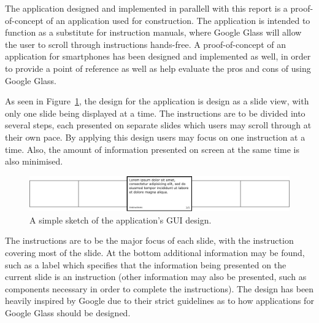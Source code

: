 The application designed and implemented in parallell with this report is a proof-of-concept of an application used for construction. The application is intended to function as a substitute for instruction manuals, where Google Glass will allow the user to scroll through instructions hands-free. A proof-of-concept of an application for smartphones has been designed and implemented as well, in order to provide a point of reference as well as help evaluate the pros and cons of using Google Glass.

As seen in Figure~\ref{cardDesign}, the design for the application is design as a slide view, with only one slide being displayed at a time. The instructions are to be divided into several steps, each presented on separate slides which users may scroll through at their own pace. By applying this design users may focus on one instruction at a time. Also, the amount of information presented on screen at the same time is also minimised. 

	\begin{figure}[ht!]
		\centering
		\includegraphics[width=150mm]{images/cardDesign}
		\caption{A simple sketch of the application's GUI design.}
		\label{cardDesign}
	\end{figure}

The instructions are to be the major focus of each slide, with the instruction covering most of the slide. At the bottom additional information may be found, such as a label which specifies that the information being presented on the current slide is an instruction (other information may also be presented, such as components necessary in order to complete the instructions). The design has been heavily inspired by Google due to their strict guidelines as to how applications for Google Glass should be designed.
